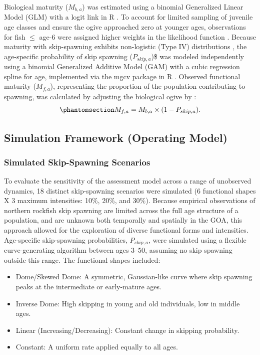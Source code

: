 \documentclass[
  authoryear,
  preprint,
  3p]{elsarticle}
\providecommand{\tightlist}{%
  \setlength{\itemsep}{0pt}\setlength{\parskip}{0pt}}
\begin{document}
Biological maturity (\(M_{b,a}\)) was estimated using a binomial
Generalized Linear Model (GLM) with a logit link in R \citep{Rcore}. To
account for limited sampling of juvenile age classes and ensure the
ogive approached zero at younger ages, observations for fish \(\le\)
age-6 were assigned higher weights in the likelihood function
\citep{Conrath2021}. Because maturity with skip-spawning exhibits
non-logistic (Type IV) distributions \citep{Trippel1991}, the
age-specific probability of skip spawning (\(P_{skip,a}\))\$ was modeled
independently using a binomial Generalized Additive Model (GAM) with a
cubic regression spline for age, implemented via the mgcv package in R
\citep[\citet{Rcore}]{mgcv}. Observed functional maturity (\(M_{f,a}\)),
representing the proportion of the population contributing to spawning,
was calculated by adjusting the biological ogive by :
\begin{equation}\protect\phantomsection\label{eq-pskip}{
M_{f,a} = M_{b,a} \times (1 - P_{skip,a}).
}\end{equation}

\subsection{Simulation Framework (Operating
Model)}\label{simulation-framework-operating-model}

\subsubsection{Simulated Skip-Spawning
Scenarios}\label{simulated-skip-spawning-scenarios}

To evaluate the sensitivity of the assessment model across a range of
unobserved dynamics, 18 distinct skip-spawning scenarios were simulated
(6 functional shapes X 3 maximum intensities: 10\%, 20\%, and 30\%).
Because empirical observations of northern rockfish skip spawning are
limited across the full age structure of a population, and are unknown
both temporally and spatially in the GOA, this approach allowed for the
exploration of diverse functional forms and intensities. Age-specific
skip-spawning probabilities, \(P_{skip,a}\), were simulated using a
flexible curve-generating algorithm between ages 3--50, assuming no skip
spawning outside this range. The functional shapes included:

\begin{itemize}
\tightlist
\item
  Dome/Skewed Dome: A symmetric, Gaussian-like curve where skip spawning
  peaks at the intermediate or early-mature ages.
\item
  Inverse Dome: High skipping in young and old individuals, low in
  middle ages.
\item
  Linear (Increasing/Decreasing): Constant change in skipping
  probability.
\item
  Constant: A uniform rate applied equally to all ages.
\end{itemize}
\end{document}
